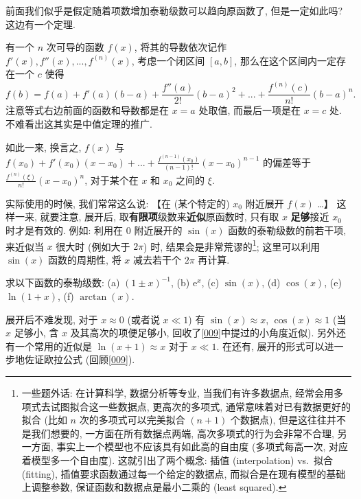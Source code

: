 \begin{tcolorbox}[size=fbox, breakable, enhanced jigsaw, title={泰勒级数 (Taylor Series)}]
\begin{tcolorbox}[size=fbox, breakable, enhanced jigsaw, title={收敛性}]
前面我们似乎是假定随着项数增加泰勒级数可以趋向原函数了, 但是一定如此吗?
这边有一个定理.

\begin{tcolorbox}[size=fbox, breakable, enhanced jigsaw, title={泰勒中值定理 (Taylor's Theorem)}]

有一个 $n$ 次可导的函数 $f(x)$, 将其的导数依次记作
$f'(x),f''(x),...,f^{(n)}(x)$, 考虑一个闭区间 $[a,b]$,
那么在这个区间内一定存在一个 $c$ 使得 \[
f(b)=f(a)+f'(a)(b-a)+\frac{f''(a)}{2!}(b-a)^2+...+\frac{f^{(n)}(c)}{n!}(b-a)^n.
\] 注意等式右边前面的函数和导数都是在 $x=a$ 处取值, 而最后一项是在
$x=c$ 处. 不难看出这其实是中值定理的推广.

如此一来, 换言之, $f(x)$ 与
$f(x_0)+f'(x_0)(x-x_0)+...+\frac{f^{(n-1)}(x_0)}{(n-1)!}(x-x_0)^{n-1}$
的偏差等于 $\frac{f^{(n)}(\xi)}{n!}(x-x_0)^n$, 对于某个在 $x$ 和
$x_0$ 之间的 $\xi$.

\end{tcolorbox}

实际使用的时候, 我们常常这么说: 【在 (某个特定的) $x_0$ 附近展开
$f(x)$ \ldots】 这样一来, 就要注意, 展开后,
取\textbf{有限项}级数来\textbf{近似}原函数时, 只有取 $x$
\textbf{足够}接近 $x_0$ 时才是有效的. 例如: 利用在 $0$ 附近展开的
$\sin(x)$ 函数的泰勒级数的前若干项, 来近似当 $x$ 很大时 (例如大于
$2\pi$) 时, 结果会是非常荒谬的\footnote{一些题外话: 在计算科学,
  数据分析等专业, 当我们有许多数据点,
  经常会用多项式去试图拟合这一些数据点, 更高次的多项式,
  通常意味着对已有数据更好的拟合 (比如 $n$ 次的多项式可以完美拟合
  $(n+1)$ 个数据点), 但是这往往并不是我们想要的,
  一方面在所有数据点两端, 高次多项式的行为会非常不合理, 另一方面,
  事实上一个模型也不应该具有如此高的自由度 (多项式每高一次,
  对应着模型多一个自由度). 这就引出了两个概念: 插值 (interpolation)
  vs.~拟合 (fitting), 插值要求函数通过每一个给定的数据点,
  而拟合是在现有模型的基础上调整参数, 保证函数和数据点是最小二乘的
  (least squared).}; 这里可以利用 $\sin(x)$ 函数的周期性, 将 $x$
减去若干个 $2\pi$ 再计算.

\end{tcolorbox}

\end{tcolorbox}

\begin{tcolorbox}[size=fbox, breakable, enhanced jigsaw, title={练习}]

求以下函数的泰勒级数: (a) $(1\pm x)^{-1}$, (b) $\mathrm{e}^x$, (c)
$\sin(x)$, (d) $\cos(x)$, (e) $\ln(1+x)$, (f) $\arctan(x)$.

展开后不难发现, 对于 $x\approx 0$ (或者说 $x\ll1$) 有
$\sin(x)\approx x$, $\cos(x)\approx 1$ (当 $x$ 足够小, 含 $x$
及其高次的项便足够小, 回收了\ref{009}中提过的小角度近似).
另外还有一个常用的近似是 $\ln(x+1)\approx x$ 对于 $x\ll 1$. 在还有,
展开的形式可以进一步地佐证欧拉公式 (回顾\ref{009}).

\end{tcolorbox}